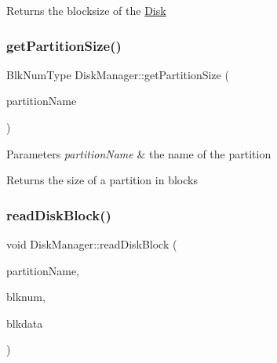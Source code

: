 \begin{DoxyReturn}{Returns}
the blocksize of the \mbox{\hyperlink{classDisk}{Disk}} 
\end{DoxyReturn}
\mbox{\label{classDiskManager_ae32627ccfa72013e35da637570e1729b}} 
\subsubsection{\texorpdfstring{get\+Partition\+Size()}{getPartitionSize()}}
{\footnotesize\ttfamily Blk\+Num\+Type Disk\+Manager\+::get\+Partition\+Size (\begin{DoxyParamCaption}\item[{string}]{partition\+Name }\end{DoxyParamCaption})}


\begin{DoxyParams}{Parameters}
{\em partition\+Name} & the name of the partition \\
\hline
\end{DoxyParams}
\begin{DoxyReturn}{Returns}
the size of a partition in blocks 
\end{DoxyReturn}
\mbox{\label{classDiskManager_afda24be04fb85711236a4d5905a5ad1c}} 
\subsubsection{\texorpdfstring{read\+Disk\+Block()}{readDiskBlock()}}
{\footnotesize\ttfamily void Disk\+Manager\+::read\+Disk\+Block (\begin{DoxyParamCaption}\item[{string}]{partition\+Name,  }\item[{Blk\+Num\+Type}]{blknum,  }\item[{char $\ast$}]{blkdata }\end{DoxyParamCaption})}

